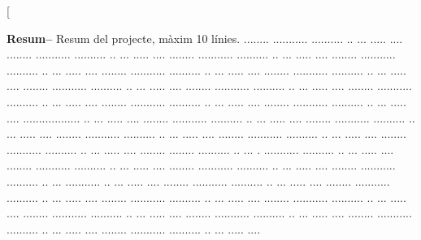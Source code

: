 ﻿\documentclass[10pt,a4paper,twocolumn,twoside]{article}
\begin{document}
\twocolumn[\begin{@twocolumnfalse}


\maketitle

\thispagestyle{primerapagina}
\begin{center}
\parbox{0.915\textwidth}
{\sffamily
\textbf{Resum--}
Resum del projecte, màxim 10 línies. ........ ........... .......... ..  ... ..... .... ........ ........... .......... ..  ... ..... .... ........ ........... .......... ..  ... ..... .... ........ ........... .......... ..  ... ..... .... ........ ........... .......... ..  ... ..... .... ........ ........... .......... ..  ... ..... .... ........ ........... .......... ..  ... ..... .... ........ ........... .......... ..  ... ..... .... ........ ........... .......... ..  ... ..... .... ........ ........... .......... ..  ... ..... .... ........ ........... .......... ..  ... ..... .... .................. ..  ... ..... .... ........ ........... .......... ..  ... ..... .... ........ ........... .......... ..  ... ..... .... ........ ........... .......... ..  ... ..... .... ........ ........... .......... ..  ... ..... .... ........ ........... .......... ..  ... ..... .... ........ ........ .......... ..  ... . ........... .......... ..  ... ..... .... ........ ........... .......... ..  ... ..... .... ........ ........... .......... ..  ... ..... .... ........ ........... .......... ..  ... ........... ..  ... ..... .... ........ ........... .......... ..  ... ..... .... ........ ........... .......... ..  ... ..... .... ........ ........... .......... ..  ... ..... .... ........ ........... .......... ..  ... ..... .... ........ ........... .......... ..  ... ..... .... ........ ........... .......... ..  ... ..... .... ........ ........... .......... ..  ... ..... .... ........ ........... .......... ..  ... ..... ....
\\
\\
}
\end{center}
\end{@twocolumnfalse}
\end{document}
